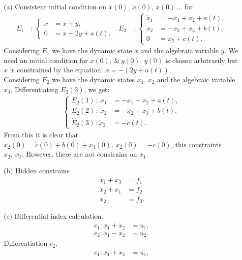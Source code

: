 \begin{enumerate}
	\item[(a)] Consistent initial condition on $ x(0),\,\dot x(0),\,\ddot x(0)\,\dots $ for
	\begin{align*}
		E_1\,&:\,\begin{cases} 
			\dot x &= x + y,\\
			0 &= x + 2y + a(t).
		\end{cases} & 
		E_2\,&:\,\begin{cases} 
			\dot x_1 &= -x_1 + x_2 + a(t),\\ 
			\dot x_2 &= -x_2 + x_3 + b(t),\\ 	
			0 &= x_2 + c(t).
		\end{cases} 
	\end{align*}
	Considering $E_1$ we have the dynamic state $ x $ and the algebraic variable $ y $. We need an initial condition for $x(0),\ \&\ y(0)$. $ y(0) $ is chosen arbitrarily but $x$ is constrained by the equation: $x = - \left(2y + a(t)\right)$.\\
	Considering $E_2$ we have the dynamic states $ x_1,\,x_2 $ and the algebraic variable $ x_3 $. Differentiating $ E_2(3) $, we get:
	\begin{align*}
		\begin{cases} 
			E_2(1)\,:\,\dot x_1 &= -x_1 + x_2 + a(t),\\ 
			E_2(2)\,:\,\dot x_2 &= -x_2 + x_3 + b(t),\\ 	
			\dot E_2(3)\,:\dot x_2 &= -\dot c(t).
		\end{cases} 
	\end{align*}
	From this it is clear that $ x_2(0) = \dot c(0) + b(0) + x_3(0),\ x_2(0) = -c(0)  $, this constraints $ x_2,\ x_3 $. However, there are not constrains on $ x_1 $.\\
	\item[(b)] Hidden constrains
	\begin{align*}
		\dot x_1 + x_3 &= f_1 \\
		\dot x_2 + x_1 &= f_2 \\
		x_2 &= f_3. 
	\end{align*}
	\item[(c)] Differential index calculation.
	\begin{align*}
		e_1:\dot x_1 + \dot x_2 &= u_1,\\
		e_2:x_1 - x_2 &= u_2.
	\end{align*}
	Differentiation $ e_2 $,
	\begin{align*}
		e_1:\dot x_1 + \dot x_2 &= u_1,\\

\end{align*}
\end{enumerate}
